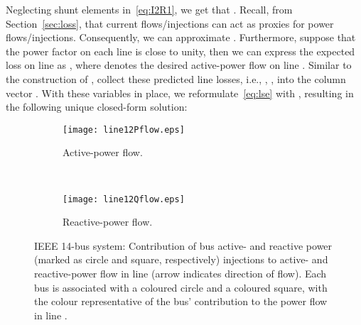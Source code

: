 \documentclass[journal]{IEEEtran}
\theoremstyle{definition}
\begin{document}
Neglecting shunt elements in~\eqref{eq:I2R1}, we get that .  Recall, from Section~\ref{sec:loss}, that current flows/injections can act as proxies for power flows/injections.  Consequently, we can approximate .  Furthermore, suppose that the power factor on each line  is close to unity, then we can express the expected loss on line  as , where  denotes the desired active-power flow on line .  Similar to the construction of , collect these predicted line losses, i.e., , , into the column vector .  With these variables in place, we reformulate~\eqref{eq:lse} with , resulting in the following unique closed-form solution:


\begin{figure*}[t!]
        \centering
        \begin{subfigure}[b]{0.49\textwidth}
                \centering
                \texttt{[image: line12Pflow.eps]}
                \caption{Active-power flow.}
                \label{fig:line7Pflow}
        \end{subfigure}~~
        \begin{subfigure}[b]{0.49\textwidth}
                \centering
                \texttt{[image: line12Qflow.eps]}
                \caption{Reactive-power flow.}
                \label{fig:line7Qflow}
        \end{subfigure} 
        \caption{IEEE 14-bus system: Contribution of bus active- and reactive power (marked as circle and square, respectively) injections to active- and reactive-power flow in line  (arrow indicates direction of flow).  Each bus is associated with a coloured circle and a coloured square, with the colour representative of the bus' contribution to the power flow in line .}
        \label{fig:14bus_divider}
        \vspace{-10pt}
\end{figure*}
\end{document}
